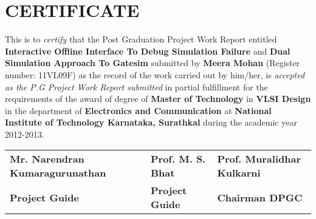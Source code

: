 \section*{\centering CERTIFICATE}
This is to \emph{certify} that the Post Graduation Project Work Report entitled 
{\bf Interactive Offline Interface To Debug Simulation Failure} and {\bf Dual Simulation Approach To Gatesim} 
submitted by {\bf Meera Mohan} (Register number: 11VL09F) as the 
record of the work carried out by him/her, is \emph{accepted as the  
P.G Project Work Report submitted} in partial fulfillment for 
the requirements of the award of degree of {\bf Master of Technology} 
in {\bf VLSI Design} in the department of {\bf Electronics and Communication} 
at {\bf National Institute of Technology Karnataka, Surathkal} during the 
academic year 2012-2013.

\vspace{1.4in}

 \begin{tabular}{lll}
 \hspace{-1cm}\bf{Mr. Narendran Kumaragurunathan}	&\hspace{.7cm}\bf{Prof. M. S. Bhat}	 &\hspace{.7cm}\bf{Prof. Muralidhar Kulkarni}	\\
 \hspace{-1cm}\bf{Project Guide} &\hspace{.7cm}\bf{Project Guide}		&\hspace{.7cm}\bf{Chairman DPGC}
\end{tabular}










